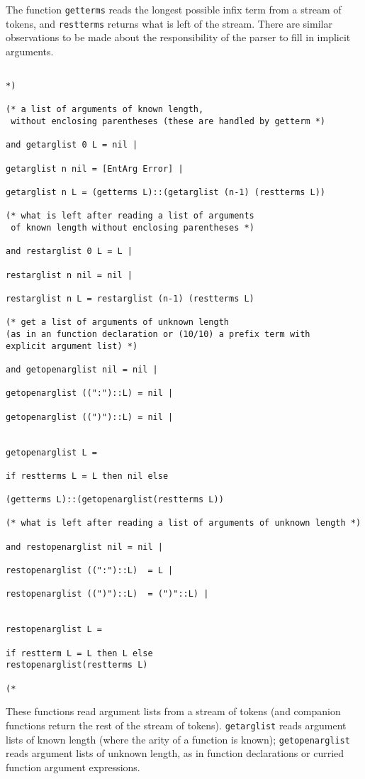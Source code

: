 \documentclass{article}
\begin{document}
The function {\tt getterms} reads the longest possible infix term from a stream of tokens, and {\tt restterms} returns what is left of the stream.   There are similar observations to be made about the responsibility of the parser to fill in implicit arguments.

\begin{verbatim}

*)

(* a list of arguments of known length,
 without enclosing parentheses (these are handled by getterm *)

and getarglist 0 L = nil |

getarglist n nil = [EntArg Error] |

getarglist n L = (getterms L)::(getarglist (n-1) (restterms L))

(* what is left after reading a list of arguments
 of known length without enclosing parentheses *)

and restarglist 0 L = L |

restarglist n nil = nil |

restarglist n L = restarglist (n-1) (restterms L)

(* get a list of arguments of unknown length 
(as in an function declaration or (10/10) a prefix term with
explicit argument list) *)

and getopenarglist nil = nil |

getopenarglist ((":")::L) = nil |

getopenarglist ((")")::L) = nil |


getopenarglist L = 

if restterms L = L then nil else

(getterms L)::(getopenarglist(restterms L))

(* what is left after reading a list of arguments of unknown length *)

and restopenarglist nil = nil |

restopenarglist ((":")::L)  = L |

restopenarglist ((")")::L)  = (")"::L) |


restopenarglist L = 

if restterm L = L then L else
restopenarglist(restterms L)

(*

\end{verbatim}

These functions read argument lists from a stream of tokens (and companion functions return the rest of the stream of tokens).  {\tt getarglist} reads argument lists of known length
(where the arity of a function is known);  {\tt getopenarglist} reads argument lists of unknown length, as in function declarations or curried function argument expressions.
\end{document}
